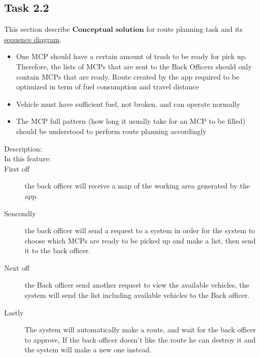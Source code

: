 \documentclass[a4paper]{article}
\begin{document}
\subsection{Task 2.2}


This section describe $\textbf{Conceptual solution}$ for route planning task and its \hyperlink{sequence}{sequence diagram}.
\begin{itemize}
    \item One MCP should have a certain amount of trash to be ready for pick up. Therefore, the lists of MCPs that are sent to the Back Officers should only contain MCPs that are ready. Route created by the app required to be optimized in term of fuel consumption and travel distance
    \item Vehicle must have sufficient fuel, not broken, and can operate normally
    \item The MCP full pattern (how long it usually take for an MCP to be filled) should be understood to perform route planning accordingly
\end{itemize}

\begin{description}
\item[Description: ]
\item[In this feature:]
\item [First off] the back officer will receive a map of the working area generated by the app.
\item [Sencondly] the back officer will send a request to a system in order for the system to choose which MCPs are ready to be picked up and make a list, then send it to the back officer.
\item [Next off] the Back officer send another request to view the available vehicles, the system will send the list including available vehicles to the Back officer.
\item [Lastly] The system will automatically make a route, and wait for the back officer to approve,
If the back officer doesn't like the route he can destroy it and the system will make a new one instead.
\end{description}
\end{document}
